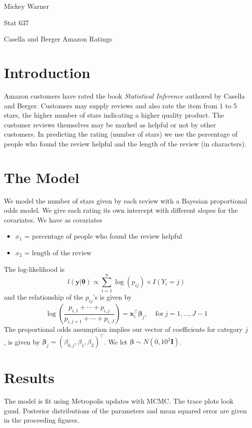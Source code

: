 \documentclass[12pt]{article}
\newcommand{\m}[1]{\mathbf{\bm{#1}}}
\begin{document}
\noindent Mickey Warner
\smallskip

\noindent Stat 637
\smallskip

\noindent Casella and Berger Amazon Ratings
\bigskip

\section*{Introduction}

\noindent Amazon customers have rated the book \emph{Statistical Inference} authored by Casella and Berger. Customers may supply reviews and also rate the item from 1 to 5 stars, the higher number of stars indicating a higher quality product. The customer reviews themselves may be marked as helpful or not by other customers. In predicting the rating (number of stars) we use the percentage of people who found the review helpful and the length of the review (in characters).

\section*{The Model}

\noindent We model the number of stars given by each review with a Bayesian proportional odds model. We give each rating its own intercept with different slopes for the covariates. We have as covariates
\begin{itemize}[label=$\cdot$]
\item $x_1$ = percentage of people who found the review helpful
\item $x_2$ = length of the review
\end{itemize}
\noindent The log-likelihood is 
\[ l(\m{y}|\m{\theta}) \propto \sum_{i=1}^n \log(p_{ij}) \times I(Y_i=j) \]
\noindent and the relationship of the $p_{ij}$'s is given by
\[ \log\left(\frac{p_{i,1}+\cdots+p_{i,j}}{p_{i,j+1}+\cdots+p_{i,J}}\right) = \m{x}_i^\top \m{\beta}_j, ~~~~~ \mathrm{for}~j=1,\ldots,J-1 \]
\noindent The proportional odds assumption implies our vector of coefficients for category $j$, is given by $\m{\beta}_j=(\beta_{0,j}, \beta_1, \beta_2)^\top$. We let $\m{\beta}\sim N(0, 10^2\m{I})$. 

\section*{Results}

\noindent The model is fit using Metropolis updates with MCMC. The trace plots look guud. Posterior distributions of the parameters and mean squared error are given in the proceeding figures.
\bigskip
\end{document}
